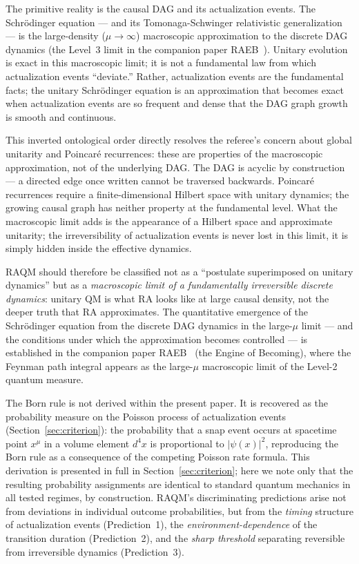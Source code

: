 \documentclass[11pt,a4paper]{article}
\theoremstyle{plain}
\theoremstyle{definition}
\theoremstyle{remark}
\begin{document}
The primitive reality is the causal DAG and its actualization events.
The Schr\"{o}dinger equation --- and its Tomonaga-Schwinger relativistic
generalization --- is the large-density ($\mu \to \infty$) macroscopic
approximation to the discrete DAG dynamics (the Level~3 limit in the
companion paper RAEB~\citep{Sandeman2026RAEB}). Unitary evolution is
exact in this macroscopic limit; it is not a fundamental law from which
actualization events ``deviate.'' Rather, actualization events are the
fundamental facts; the unitary Schr\"{o}dinger equation is an
approximation that becomes exact when actualization events are so frequent
and dense that the DAG graph growth is smooth and continuous.

This inverted ontological order directly resolves the referee's concern
about global unitarity and Poincar\'{e} recurrences: these are properties
of the macroscopic approximation, not of the underlying DAG. The DAG is
acyclic by construction --- a directed edge once written cannot be
traversed backwards. Poincar\'{e} recurrences require a finite-dimensional
Hilbert space with unitary dynamics; the growing causal graph has neither
property at the fundamental level. What the macroscopic limit adds is
the appearance of a Hilbert space and approximate unitarity; the
irreversibility of actualization events is never lost in this limit,
it is simply hidden inside the effective dynamics.

RAQM should therefore be classified not as a ``postulate superimposed on
unitary dynamics'' but as a \emph{macroscopic limit of a fundamentally
irreversible discrete dynamics}: unitary QM is what RA looks like at
large causal density, not the deeper truth that RA approximates.
The quantitative emergence of the Schr\"odinger equation from the
discrete DAG dynamics in the large-$\mu$ limit --- and the conditions
under which the approximation becomes controlled --- is established in
the companion paper RAEB~\citep{Sandeman2026RAEB} (the Engine of Becoming),
where the Feynman path integral appears as the large-$\mu$ macroscopic
limit of the Level-2 quantum measure.

The Born rule is not derived within the present paper. It is recovered as
the probability measure on the Poisson process of actualization events
(Section~\ref{sec:criterion}): the probability that a snap event occurs
at spacetime point $x^\mu$ in a volume element $d^4x$ is proportional to
$|\psi(x)|^2$, reproducing the Born rule as a consequence of the competing
Poisson rate formula. This derivation is presented in full in
Section~\ref{sec:criterion}; here we note only that the resulting probability
assignments are identical to standard quantum mechanics in all tested regimes,
by construction. RAQM's discriminating predictions arise not from deviations in
individual outcome probabilities, but from the \emph{timing} structure of
actualization events (Prediction~1), the \emph{environment-dependence} of
the transition duration (Prediction~2), and the \emph{sharp threshold}
separating reversible from irreversible dynamics (Prediction~3).
\end{document}
